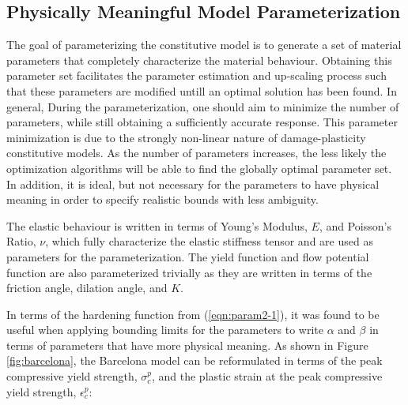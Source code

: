 \subsection{Physically Meaningful Model Parameterization}

The goal of parameterizing the constitutive model is to generate a set of material parameters that completely characterize the material behaviour. Obtaining this parameter set facilitates the parameter estimation and up-scaling process such that these parameters are modified untill an optimal solution has been found. In general, During the parameterization, one should aim to minimize the number of parameters, while still obtaining a sufficiently accurate response. This parameter minimization is due to the strongly non-linear nature of damage-plasticity constitutive models. As the number of parameters increases, the less likely the optimization algorithms will be able to find the globally optimal parameter set. In addition, it is ideal, but not necessary for the parameters to have physical meaning in order to specify realistic bounds with less ambiguity.

The elastic behaviour is written in terms of Young's Modulus, $E$, and Poisson's Ratio, $\nu$, which fully characterize the elastic stiffness tensor and are used as parameters for the parameterization. The yield function and flow potential function are also parameterized trivially as they are written in terms of the friction angle, dilation angle, and $K$.

In terms of the hardening function from (\ref{eqn:param2-1}), it was found to be useful when applying bounding limits for the parameters to write $\alpha$ and $\beta$ in terms of parameters that have more physical meaning.  As shown in Figure \ref{fig:barcelona}, the Barcelona model can be reformulated in terms of the peak compressive yield strength, $\sigma_{c}^{p}$, and the plastic strain at the peak compressive yield strength, $\epsilon_c^{p}$:
